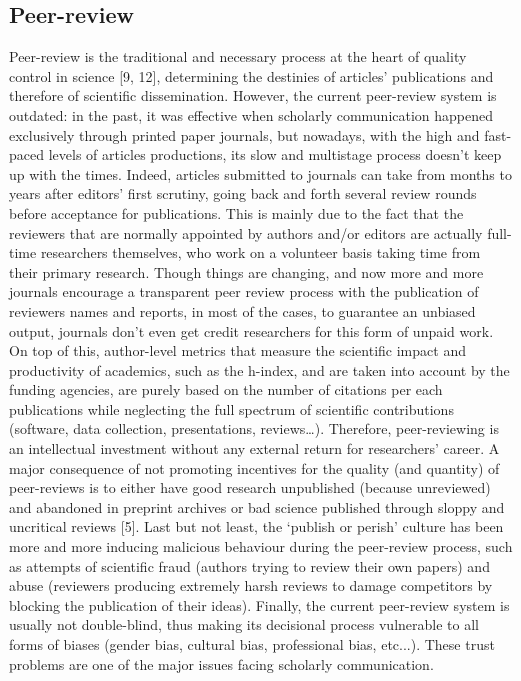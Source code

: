 \documentclass[runningheads]{llncs}
\begin{document}
\subsection{Peer-review}
Peer-review is the traditional and necessary process at the heart of quality control in science [9, 12], determining the destinies of articles’ publications and therefore of scientific dissemination. However, the current peer-review system is outdated: in the past, it was effective when scholarly communication happened exclusively through printed paper journals, but nowadays, with the high and fast-paced levels of articles productions, its slow and multistage process doesn’t keep up with the times. Indeed, articles submitted to journals can take from months to years after editors’ first scrutiny, going back and forth several review rounds before acceptance for publications. This is mainly due to the fact that the reviewers that are normally appointed by authors and/or editors are actually full-time researchers themselves, who work on a volunteer basis taking time from their primary research. Though things are changing, and now more and more journals encourage a transparent peer review process with the publication of reviewers names and reports, in most of the cases, to guarantee an unbiased output, journals don’t even get credit researchers for this form of unpaid work. On top of this, author-level metrics that measure the scientific impact and productivity of academics, such as the h-index, and are taken into account by the funding agencies, are purely based on the number of citations per each publications while neglecting the full spectrum of scientific contributions (software, data collection, presentations, reviews…). Therefore, peer-reviewing is an intellectual investment without any external return for researchers’ career. A major consequence of not promoting incentives for the quality (and quantity) of peer-reviews is to either have good research unpublished (because unreviewed) and abandoned in preprint archives or bad science published through sloppy and uncritical reviews [5]. Last but not least, the ‘publish or perish’ culture has been more and more inducing malicious behaviour during the peer-review process, such as attempts of scientific fraud (authors trying to review their own papers) and abuse (reviewers producing extremely harsh reviews to damage competitors by blocking the publication of their ideas). Finally, the current peer-review system is usually not double-blind, thus making its decisional process vulnerable to all forms of biases (gender bias, cultural bias, professional bias, etc...). These trust problems are one of the major issues facing scholarly communication.
\end{document}
